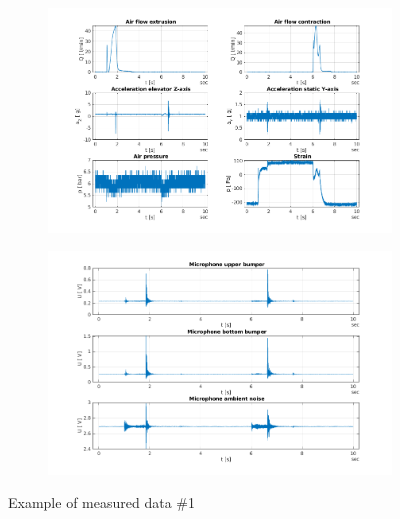 \documentclass[class=article, crop=false]{standalone}
\begin{document}
\begin{figure}[h!]
    \centering
    \begin{subfigure}{.5\textwidth}
        \centering
        \includegraphics[width=1.1\textwidth]{data_example1.png}
    \end{subfigure}%
    \begin{subfigure}{.5\textwidth}
        \centering
        \includegraphics[width=1.1\textwidth]{data_example2.png}
    \end{subfigure}
    \caption{Example of measured data \#1}
    \label{fig:data_exmp1}
\end{figure}
\end{document}
